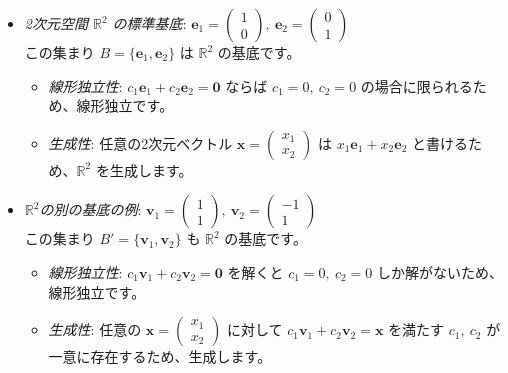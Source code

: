 \begin{ex}
\begin{itemize}
\item \emph{2次元空間 $\mathbb{R}^2$ の標準基底}: $\bm{e}_1 = \begin{pmatrix} 1 \\ 0 \end{pmatrix},\ \bm{e}_2 = \begin{pmatrix} 0 \\ 1 \end{pmatrix}$\\
	この集まり $B = \{\bm{e}_1, \bm{e}_2\}$ は $\mathbb{R}^2$ の基底です。
	\begin{itemize}
	\item \emph{線形独立性}: $c_1 \bm{e}_1 + c_2 \bm{e}_2 = \bm{0}$ ならば $c_1=0,\ c_2=0$ の場合に限られるため、線形独立です。
    \item \emph{生成性}: 任意の2次元ベクトル $\bm{x} = \begin{pmatrix} x_1 \\ x_2 \end{pmatrix}$ は $x_1 \bm{e}_1 + x_2 \bm{e}_2$ と書けるため、$\mathbb{R}^2$ を生成します。
    \end{itemize}
\item \emph{$\mathbb{R}^2$の別の基底の例}: $\bm{v}_1 = \begin{pmatrix} 1 \\ 1 \end{pmatrix},\ \bm{v}_2 = \begin{pmatrix} -1 \\ 1 \end{pmatrix}$\\
    この集まり $B' = \{\bm{v}_1, \bm{v}_2\}$ も $\mathbb{R}^2$ の基底です。
	\begin{itemize}
    \item \emph{線形独立性}: $c_1 \bm{v}_1 + c_2 \bm{v}_2 = \bm{0}$ を解くと $c_1=0,\ c_2=0$ しか解がないため、線形独立です。
    \item \emph{生成性}: 任意の $\bm{x} = \begin{pmatrix} x_1 \\ x_2 \end{pmatrix}$ に対して $c_1 \bm{v}_1 + c_2 \bm{v}_2 = \bm{x}$ を満たす $c_1,\ c_2$ が一意に存在するため、生成します。
    \end{itemize}
\end{itemize}
\end{ex}

